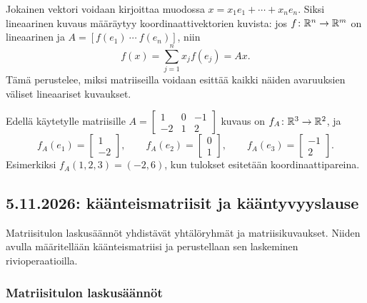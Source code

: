 \documentclass[11pt,a4paper]{amsart}
\begin{document}
  Jokainen vektori voidaan kirjoittaa muodossa
  $x=x_1e_1+\cdots+x_ne_n$. Siksi lineaarinen kuvaus määräytyy
  koordinaattivektorien kuvista: jos $f\colon\mathbb{R}^n\to\mathbb{R}^m$ on
  lineaarinen ja $A=[f(e_1)\ \cdots\ f(e_n)]$, niin
  \[
    f(x)=\sum_{j=1}^n x_jf(e_j)=Ax.
  \]
  Tämä perustelee, miksi matriiseilla voidaan esittää kaikki
  näiden avaruuksien väliset lineaariset kuvaukset.

  \begin{example}
    Edellä käytetylle matriisille
    $A=\left[
      \begin{smallmatrix}1&0&-1\\-2&1&2
    \end{smallmatrix}\right]$
    kuvaus on $f_A\colon\mathbb{R}^3\to\mathbb{R}^2$, ja
    \[
      f_A(e_1)=
      \begin{bmatrix}1\\-2
      \end{bmatrix},\qquad
      f_A(e_2)=
      \begin{bmatrix}0\\1
      \end{bmatrix},\qquad
      f_A(e_3)=
      \begin{bmatrix}-1\\2
      \end{bmatrix}.
    \]
    Esimerkiksi $f_A(1,2,3)=(-2,6)$, kun tulokset esitetään
    koordinaattipareina.
  \end{example}

  \subsection{5.11.2026: käänteismatriisit ja kääntyvyyslause}

  Matriisitulon laskusäännöt yhdistävät yhtälöryhmät ja matriisikuvaukset.
  Niiden avulla määritellään käänteismatriisi ja perustellaan sen
  laskeminen rivioperaatioilla.

  \subsubsection*{Matriisitulon laskusäännöt}
\end{document}

